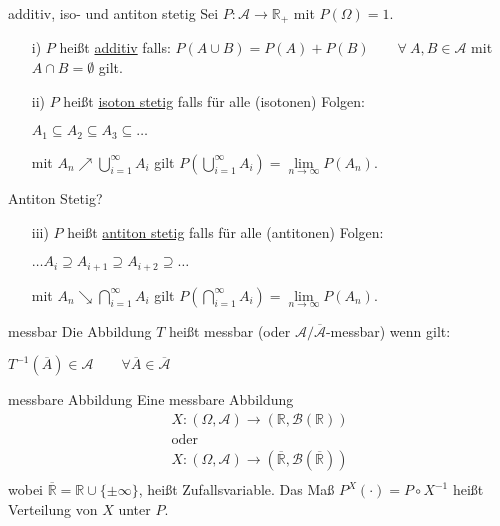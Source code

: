 \documentclass[avery5371,grid,frame]{flashcards} %
\newcommand{\1}{ \mathbb{1} } %
\begin{document}
\begin{flashcard}[Definition]{additiv, iso- und antiton stetig}
  Sei $P:\mathcal{A} \to \mathbb{R}_+$ mit $P(\Omega)=1$.
  \begin{itemize}
  \item[i)] $P$ heißt \underline{additiv} falls: $P(A\cup B)=P(A)+P(B) \qquad \forall~ A,B\in\mathcal{A} $ mit $A\cap B =\emptyset$ gilt. 
  \item[ii)] $P$ heißt \underline{isoton stetig}
    falls für alle (isotonen) Folgen:

      $A_1 \subseteq A_2 \subseteq A_3 \subseteq \dots$

    mit $A_n \nearrow \bigcup\limits_{i=1}^\infty A_i$ gilt $P\left(\bigcup\limits_{i=1}^\infty A_i\right)=\lim\limits_{n \to \infty}P(A_n)$.
  \end{itemize}
\end{flashcard}

\begin{flashcard}{Antiton Stetig?}
  \begin{itemize}
    \item[iii)] $P$ heißt \underline{antiton stetig} falls für alle
    (antitonen) Folgen:
    \begin{center}
      $\dots A_i \supseteq A_{i+1} \supseteq A_{i+2} \supseteq \dots$
    \end{center}
    mit $A_n \searrow \bigcap\limits_{i=1}^\infty A_i$ gilt $P\left(\bigcap\limits_{i=1}^\infty A_i\right)=\lim\limits_{n \to \infty}P(A_n)$.
  \end{itemize}
\end{flashcard}
\begin{flashcard}[Definition]{messbar}
  Die Abbildung $T$ heißt messbar  (oder
  $\mathcal{A}/\overline{\mathcal{A}}$-messbar) wenn gilt:
  \begin{center}
    $T^{-1}(\overline{A}) \in \mathcal{A} \qquad \forall \overline{A}
    \in \overline{\mathcal{A}}$
  \end{center}
\end{flashcard}

\begin{flashcard}[Definition]{messbare Abbildung}
  Eine messbare Abbildung
  \begin{eqnarray*}
    X:(\Omega,\mathcal{A}) \to (\mathbb{R},\mathcal{B}(\mathbb{R}))\\
    \text{oder}\\
    X:(\Omega,\mathcal{A}) \to (\overline{\mathbb{R}},\mathcal{B}(\overline{\mathbb{R}}))\\
  \end{eqnarray*}
  wobei $\overline{\mathbb{R}}=\mathbb{R}\cup\{\pm \infty \}$, heißt Zufallsvariable. Das Maß $P^X(\cdot)=P\circ X^{-1}$ heißt Verteilung von $X$ unter $P$.
\end{flashcard}
\end{document}
